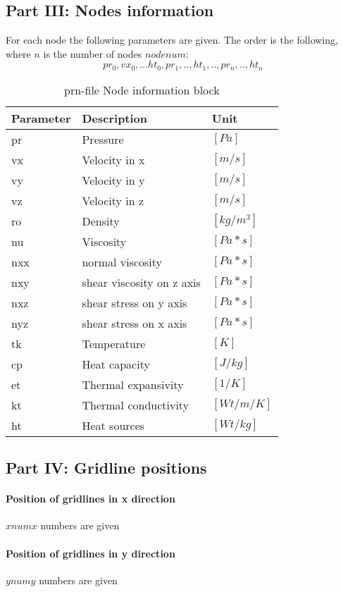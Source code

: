 \subsection{Part III: Nodes information}

For each node the following parameters are given. The order is the following, where $n$ is the number of nodes $nodenum$: $${pr_0,vx_0,...ht_0,pr_1,..,ht_1,..,pr_n,..,ht_n}$$

\begin{table}[H]
\small
\centering
\begin{tabular}{l l p{2cm}}
\toprule
Parameter & Description & Unit\\
\midrule
pr & Pressure & $[Pa]$ \\ 
vx & Velocity in x & $[m/s]$ \\ 
vy & Velocity in y & $[m/s]$ \\ 
vz & Velocity in z & $[m/s]$ \\ 
ro & Density & $[kg/m^3]$ \\ 
nu & Viscosity & $[Pa*s]$ \\ 
nxx & normal viscosity  & $[Pa*s]$ \\ 
nxy & shear viscosity on z axis & $[Pa*s]$ \\ 
nxz & shear stress on y axis & $[Pa*s]$ \\ 
nyz & shear stress on x axis & $[Pa*s]$ \\ 
tk & Temperature & $[K]$ \\ 
cp & Heat capacity & $[J/kg]$ \\ 
et & Thermal expansivity & $[1/K]$ \\ 
kt & Thermal conductivity & $[Wt/m/K]$ \\
ht  & Heat sources & $[Wt/kg]$ \\
\bottomrule
\end{tabular}
\caption{prn-file Node information block}
\label{tbl:prn_node_info}
\end{table}

\subsection{Part IV: Gridline positions}

\paragraph{Position of gridlines in x direction} $xnumx$ numbers are given
\paragraph{Position of gridlines in y direction }$ynumy$ numbers are given
